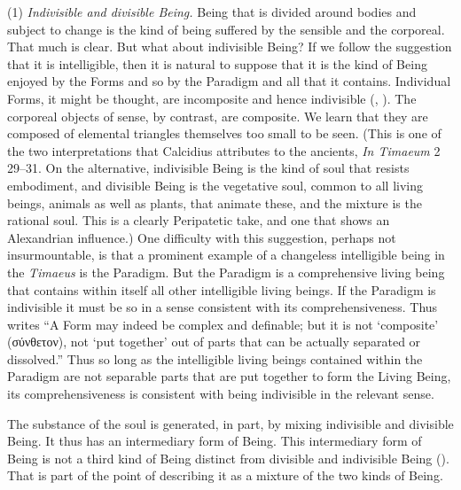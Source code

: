 (1) \emph{Indivisible and divisible Being.} Being that is divided around bodies and subject to change is the kind of being suffered by the sensible and the corporeal. That much is clear. But what about indivisible Being? If we follow the suggestion that it is intelligible, then it is natural to suppose that it is the kind of Being enjoyed by the Forms and so by the Paradigm and all that it contains. Individual Forms, it might be thought, are incomposite and hence indivisible (\citealt[64]{Cornford:1935fk}, \citealt[71]{Robinson:1970lq}). The corporeal objects of sense, by contrast, are composite. We learn that they are composed of elemental triangles themselves too small to be seen. (This is one of the two interpretations that Calcidius attributes to the ancients, \emph{In Timaeum} 2 29--31. On the alternative, indivisible Being is the kind of soul that resists embodiment, and divisible Being is the vegetative soul, common to all living beings, animals as well as plants, that animate these, and the mixture is the rational soul. This is a clearly Peripatetic take, and one that shows an Alexandrian influence.) One difficulty with this suggestion, perhaps not insurmountable, is that a prominent example of a changeless intelligible being in the \emph{Timaeus} is the Paradigm. But the Paradigm is a comprehensive living being that contains within itself all other intelligible living beings. If the Paradigm is indivisible it must be so in a sense consistent with its comprehensiveness. Thus \citet[64]{Cornford:1935fk} writes ``A Form may indeed be complex and definable; but it is not `composite' ({\sbl σύνθετον}), not `put together' out of parts that can be actually separated or dissolved.'' Thus so long as the intelligible living beings contained within the Paradigm are not separable parts that are put together to form the Living Being, its comprehensiveness is consistent with being indivisible in the relevant sense.

The substance of the soul is generated, in part, by mixing indivisible and divisible Being. It thus has an intermediary form of Being. This intermediary form of Being is not a third kind of Being distinct from divisible and indivisible Being (\citealt[]{Betegh:2019fq}). That is part of the point of describing it as a mixture of the two kinds of Being.

